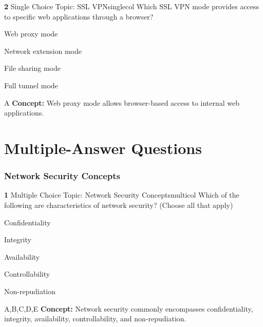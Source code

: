 \documentclass[10pt,a4paper]{article}
\begin{document}
\begin{qcard}{\color{white}\textbf{2} \hfill \small Single Choice \textbar{} Topic: SSL VPN}{singlecol}
Which SSL VPN mode provides access to specific web applications through a browser?

\begin{qoptions}
\item Web proxy mode
\item Network extension mode
\item File sharing mode
\item Full tunnel mode
\end{qoptions}
\begin{explainbox}{A}
\textbf{Concept:} Web proxy mode allows browser-based access to internal web applications.
\end{explainbox}
\end{qcard}

\part{Multiple-Answer Questions}
\section{Network Security Concepts}
\begin{qcard}{\color{white}\textbf{1} \hfill \small Multiple Choice \textbar{} Topic: Network Security Concepts}{multicol}
Which of the following are characteristics of network security? (Choose all that apply)

\begin{qoptions}
\item Confidentiality
\item Integrity
\item Availability
\item Controllability
\item Non-repudiation
\end{qoptions}
\begin{explainbox}{A,B,C,D,E}
\textbf{Concept:} Network security commonly encompasses confidentiality, integrity, availability, controllability, and non-repudiation.
\end{explainbox}
\end{qcard}
\end{document}
